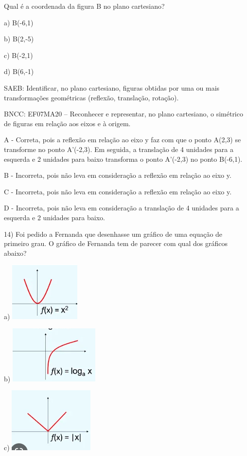 Qual é a coordenada da figura B no plano cartesiano?

a) B(-6,1)

b) B(2,-5)

c) B(-2,1)

d) B(6,-1)

SAEB: Identificar, no plano cartesiano, figuras obtidas por uma ou mais
transformações geométricas (reflexão, translação, rotação).

BNCC: EF07MA20 -- Reconhecer e representar, no plano cartesiano, o
simétrico de figuras em relação aos eixos e à origem.

A - Correta, pois a reflexão em relação ao eixo y faz com que o ponto
A(2,3) se transforme no ponto A'(-2,3). Em seguida, a translação de 4
unidades para a esquerda e 2 unidades para baixo transforma o ponto
A'(-2,3) no ponto B(-6,1).

B - Incorreta, pois não leva em consideração a reflexão em relação ao
eixo y.

C - Incorreta, pois não leva em consideração a reflexão em relação ao
eixo y.

D - Incorreta, pois não leva em consideração a translação de 4 unidades
para a esquerda e 2 unidades para baixo.

14) Foi pedido a Fernanda que desenhasse um gráfico de uma equação de
primeiro grau. O gráfico de Fernanda tem de parecer com qual dos
gráficos abaixo?

a) \includegraphics{./imgSAEB_7_MAT/media/image102.png}

b) \includegraphics{./imgSAEB_7_MAT/media/image103.png}

c) \includegraphics{./imgSAEB_7_MAT/media/image104.png}


